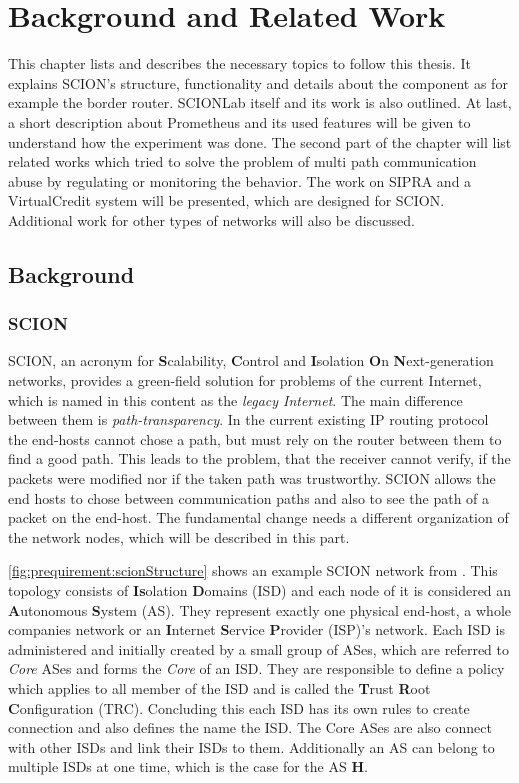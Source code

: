 \documentclass[thesis.tex]{subfiles}
\begin{document}
\chapter{Background and Related Work}  \label{chap:preqAndRel}

This chapter lists and describes the necessary topics to follow this thesis. It explains SCION's structure, functionality and details about the component as for example the border router. SCIONLab itself and its work is also outlined. At last, a short description about Prometheus and its used features will be given to understand how the experiment was done.
The second part of the chapter will list related works which tried to solve the problem of multi path communication abuse by regulating or monitoring the behavior. The work on SIPRA and a VirtualCredit system will be presented, which are designed for SCION. Additional work for other types of networks will also be discussed.

\section{Background} \label{chap:preq}

\subsection{SCION} \cite{SCIONPaper, SCIONBook}

SCION, an acronym for \textbf{S}calability, \textbf{C}ontrol and \textbf{I}solation \textbf{O}n \textbf{N}ext-generation networks, provides a green-field solution for problems of the current Internet, which is named in this content as the \textit{legacy Internet}. The main difference between them is \textit{path-transparency}. In the current existing IP routing protocol the end-hosts cannot chose a path, but must rely on the router between them to find a good path. This leads to the problem, that the receiver cannot verify, if the packets were modified nor if the taken path was trustworthy. SCION allows the end hosts to chose between communication paths and also to see the path of a packet on the end-host. The fundamental change needs a different organization of the network nodes, which will be described in this part.

\autoref{fig:prequirement:scionStructure} shows an example SCION network from \cite{SCIONPaper}. This topology consists of \textbf{Is}olation \textbf{D}omains (ISD) and each node of it is considered an \textbf{A}utonomous \textbf{S}ystem (AS). They represent exactly one physical end-host, a whole companies network or an \textbf{I}nternet \textbf{S}ervice \textbf{P}rovider (ISP)'s network. Each ISD is administered and initially created by a small group of ASes, which are referred to \textit{Core} ASes and forms the \textit{Core} of an ISD. They are responsible to define a policy which applies to all member of the ISD and is called the \textbf{T}rust \textbf{R}oot \textbf{C}onfiguration (TRC). Concluding this each ISD has its own rules to create connection and also defines the name the ISD. The Core ASes are also connect with other ISDs and link their ISDs to them. Additionally an AS can belong to multiple ISDs at one time, which is the case for the AS \textbf{H}.
\end{document}
